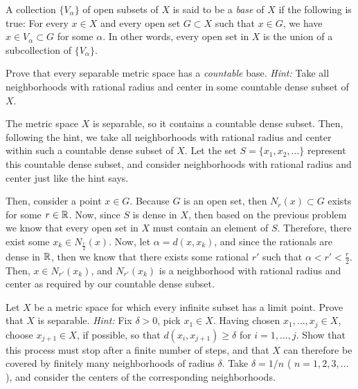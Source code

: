 \documentclass[10pt]{article}
\begin{document}
	\begin{problem}
		A collection \( \{V_\alpha\}  \) of open subsets of \( X \) is said to be a \textit{base} of \( X \) 
		if the following is true: For every \( x \in X \) and every open set \( G \subset X \) 
		such that \( x \in G \), we have \( x \in V_\alpha \subset G \) for some 
		\( \alpha \). In other words, every open set in  \( X \) is the union of a subcollection of 
		\( \{V_\alpha\}  \). 

		Prove that every separable metric space has a \textit{countable} base. \textit{Hint:} Take 
		all neighborhoods with rational radius and center in some countable dense subset of \( X \).   
	\end{problem}

	\begin{solution}
		The metric space \( X \) is separable, so it contains a countable dense subset. Then, following the hint, 
		we take all neighborhoods with rational radius and center within such a countable dense subset of \( X \). 
		Let the set \( S = \{x_1, x_2, \dots \}  \) represent this countable dense subset, and consider neighborhoods
		with rational radius and center just like the hint says. 

		Then, consider a point \( x \in G \). Because \( G \) is an open set, then \( N_r(x) \subset G\) exists 
		for some \( r \in \mathbb R \). Now, since \( S \) is dense in \( X \), then based on the previous problem 
		we know that every open set in \( X \) must contain an element of \( S \). Therefore, 
		there exist some \( x_k \in N_{\frac{r}{2}}(x) \). Now, let \( \alpha = d(x, x_k) \), and since the 
		rationals are dense in \( \mathbb R \), then we know that there exists some rational \( r' \) such that 
		\( \alpha < r' < \frac{r}{2} \). Then, \( x \in N_{r'}(x_k) \), and \( N_{r'}(x_k) \) is a neighborhood 
		with rational radius and center as required by our countable dense subset. 
	\end{solution}

	\begin{problem}
		Let \( X \) be a metric space for which every infinite subset has a limit point. Prove that 
		\( X \) is separable. \textit{Hint:} Fix \( \delta > 0 \), pick \( x_1 \in X \). Having chosen 
		\( x_1, \dots, x_j \in X \), choose \( x_{j+1} \in X \), if possible, so that \( d(x_i, x_{j+1})
		\ge  \delta \) for \( i = 1, \dots, j \). Show that this process must stop after a finite number of 
		steps, and that \( X \) can therefore be covered by finitely many neighborhoods of radius \( \delta \). 
		Take \( \delta = 1 / n \) ( \( n = 1, 2, 3, \dots \)), and consider the centers of the corresponding
		neighborhoods. 
	\end{problem}
\end{document}
